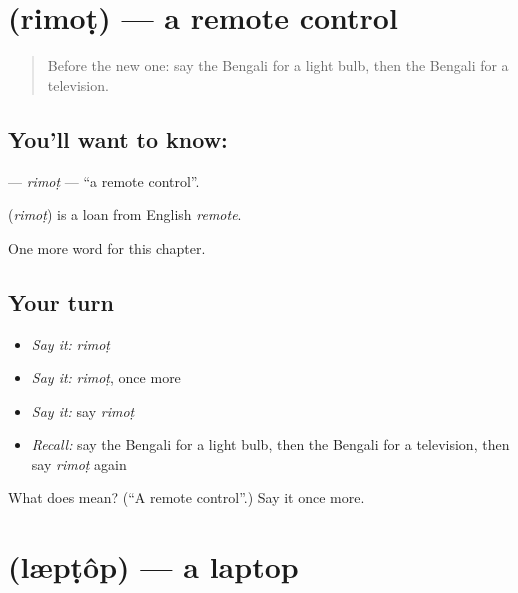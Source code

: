 \section[\texorpdfstring{\bn{রিমোট} (rimoṭ)}{রিমোট (rimoṭ)}]{ (rimoṭ) — a remote control}

\label{lesson:BN-C222-rimot}



\begin{quote}
Before the new one: say the Bengali for a light bulb, then the Bengali for a television.
\end{quote}

\subsection*{You'll want to know: }
\textbf{} — \emph{rimoṭ} — \textquotedblleft{}a remote control\textquotedblright{}.

\begin{cousinweb}
\textbf{} (\emph{rimoṭ}) is a loan from English \emph{remote}.
\end{cousinweb}

\begin{grammarlens}[title={What you've built}]
One more word for this chapter.
\end{grammarlens}

\subsection*{Your turn}
\begin{itemize}
\raggedright
  \item \emph{Say it:} \emph{rimoṭ}
  \item \emph{Say it:} \emph{rimoṭ}, once more
  \item \emph{Say it:} say \emph{rimoṭ}
  \item \emph{Recall:} say the Bengali for a light bulb, then the Bengali for a television, then say \emph{rimoṭ} again
\end{itemize}

\begin{tcolorbox}[breakable,colback=teal!4,colframe=teal!35!black,title={Before you move on}]
What does  mean? (\textquotedblleft{}A remote control\textquotedblright{}.) Say it once more.
\end{tcolorbox}
\section[\texorpdfstring{\bn{ল্যাপটপ} (læpṭôp)}{ল্যাপটপ (læpṭôp)}]{ (læpṭôp) — a laptop}


